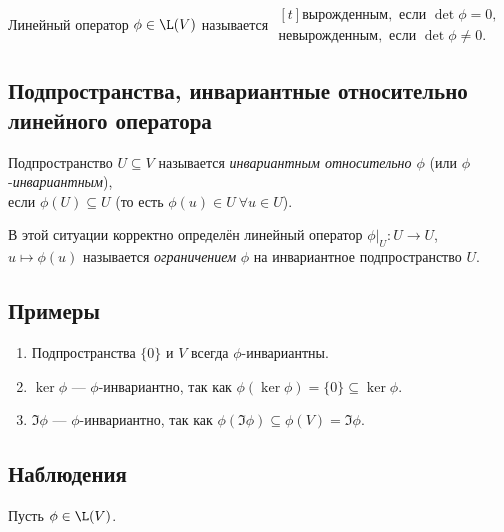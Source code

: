 \begin{definition}
    Линейный оператор $\phi \in \L(V)$ называется 
    \begin{math}
        \begin{gathered}[t]
            \textit{вырожденным}, \text{ если } \det \phi = 0, \\
            \textit{невырожденным}, \text{ если } \det \phi \neq 0.    
        \end{gathered}
    \end{math}
\end{definition}


\subsection{Подпространства, инвариантные относительно линейного оператора}

\begin{definition}
    Подпространство $U \subseteq V$ называется \textit{инвариантным относительно $\phi$} (или $\phi$-\textit{инвариантным}), \\если $\phi(U) \subseteq U$ (то есть $\phi(u) \in U \ \forall u \in U$).    
\end{definition}

В этой ситуации корректно определён линейный оператор $\phi\Big|_U \colon U \to U$, $u \mapsto \phi(u)$ называется \textit{ограничением} $\phi$ на инвариантное подпространство $U$.


\subsection{Примеры}

\begin{enumerate}
\item Подпространства $\{0\}$ и $V$ всегда $\phi$-инвариантны.
\item $\ker \phi$ --- $\phi$-инвариантно, так как $\phi(\ker \phi) = \{0\} \subseteq \ker \phi$.
\item $\Im \phi$ --- $\phi$-инвариантно, так как $\phi(\Im \phi) \subseteq \phi(V) = \Im \phi$.
\end{enumerate}



\subsection{Наблюдения}

Пусть $\phi \in \L(V)$.

